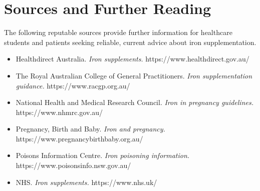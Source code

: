 \section*{Sources and Further Reading}
The following reputable sources provide further information for healthcare students and patients seeking reliable, current advice about iron supplementation.
\begin{itemize}
    \item Healthdirect Australia. \textit{Iron supplements.} https://www.healthdirect.gov.au/
    \item The Royal Australian College of General Practitioners. \textit{Iron supplementation guidance.} https://www.racgp.org.au/
    \item National Health and Medical Research Council. \textit{Iron in pregnancy guidelines.} https://www.nhmrc.gov.au/
    \item Pregnancy, Birth and Baby. \textit{Iron and pregnancy.} https://www.pregnancybirthbaby.org.au/
    \item Poisons Information Centre. \textit{Iron poisoning information.} https://www.poisonsinfo.nsw.gov.au/
    \item NHS. \textit{Iron supplements.} https://www.nhs.uk/
\end{itemize}
